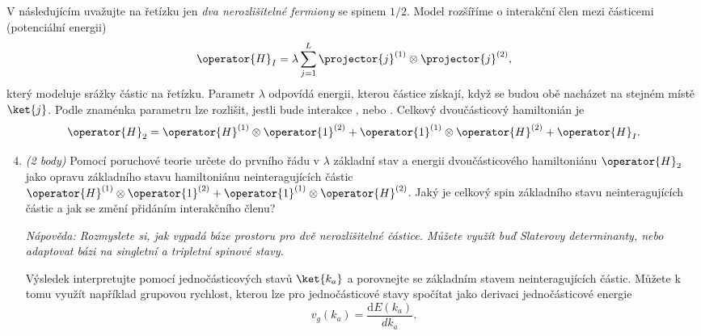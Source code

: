 \documentclass[a4paper,11pt,twoside]{book}
\begin{document}
V následujícím uvažujte na řetízku jen \emph{dva nerozlišitelné fermiony} se spinem $1/2$. 
Model rozšíříme o interakční člen mezi částicemi (potenciální energii)
\begin{equation*}
    \operator{H}_I = \lambda\sum_{j=1}^{L}\projector{j}^{(1)} \otimes \projector{j}^{(2)},
\end{equation*}
který modeluje srážky částic na řetízku.
Parametr $\lambda$ odpovídá energii, kterou částice získají, když se budou obě nacházet na stejném místě $\ket{j}$.
Podle znaménka parametru lze rozlišit, jestli bude interakce , nebo .
Celkový dvoučásticový hamiltonián je
\begin{equation*}
    \operator{H}_{2} =\operator{H}^{(1)}\otimes \operator{1}^{(2)} + \operator{1}^{(1)}\otimes\operator{H}^{(2)} + \operator{H}_I.
\end{equation*}

\begin{enumerate}
  \setcounter{enumi}{3}
  \item\emph{(2 body)} Pomocí poruchové teorie určete do prvního řádu v $\lambda$ základní stav a energii dvoučásticového hamiltoniánu $\operator{H}_{2}$ jako opravu základního stavu hamiltoniánu neinteragujících částic $\operator{H}^{(1)}\otimes \operator{1}^{(2)} + \operator{1}^{(1)}\otimes \operator{H}^{(2)}$. 
  Jaký je celkový spin základního stavu neinteragujících částic a jak se změní přidáním interakčního členu? 
  
  \textit{Nápověda: Rozmyslete si, jak vypadá báze prostoru pro dvě nerozlišitelné částice. Můžete využít buď Slaterovy determinanty, nebo adaptovat bázi na singletní a tripletní spinové stavy.}

  Výsledek interpretujte pomocí jednočásticových stavů $\ket{k_{a}}$ a porovnejte se základním stavem neinteragujících částic. Můžete k tomu využít například grupovou rychlost, kterou lze pro jednočásticové stavy spočítat jako derivaci jednočásticové energie
  \begin{equation*}
    v_g(k_a) = \frac{\text{d}E(k_a)}{dk_a}.    
  \end{equation*}
\end{enumerate}
\end{document}

